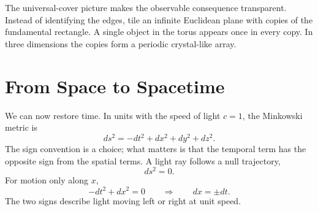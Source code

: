 The universal-cover picture makes the observable consequence transparent. Instead of identifying the edges, tile an infinite Euclidean plane with copies of the fundamental rectangle. A single object in the torus appears once in every copy. In three dimensions the copies form a periodic crystal-like array.

\begin{classroomqa}
\end{classroomqa}

\begin{classroomqa}
\end{classroomqa}

\section{From Space to Spacetime}

We can now restore time. In units with the speed of light \(c=1\), the Minkowski metric is
\begin{equation}
ds^2 = -dt^2 + dx^2 + dy^2 + dz^2.
\label{eq:c03-minkowski}
\end{equation}
The sign convention is a choice; what matters is that the temporal term has the opposite sign from the spatial terms. A light ray follows a null trajectory,
\begin{equation}
ds^2 = 0.
\end{equation}
For motion only along \(x\),
\begin{equation}
-dt^2 + dx^2 = 0
\qquad\Rightarrow\qquad
dx = \pm dt.
\label{eq:c03-null-flat}
\end{equation}
The two signs describe light moving left or right at unit speed.

